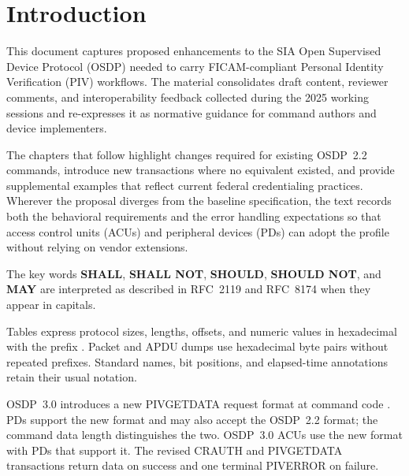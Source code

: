 \section{Introduction}

This document captures proposed enhancements to the SIA Open Supervised Device Protocol (OSDP) needed to carry FICAM-compliant Personal Identity Verification (PIV) workflows. The material consolidates draft content, reviewer comments, and interoperability feedback collected during the 2025 working sessions and re-expresses it as normative guidance for command authors and device implementers.

The chapters that follow highlight changes required for existing OSDP~2.2 commands, introduce new transactions where no equivalent existed, and provide supplemental examples that reflect current federal credentialing practices. Wherever the proposal diverges from the baseline specification, the text records both the behavioral requirements and the error handling expectations so that access control units (ACUs) and peripheral devices (PDs) can adopt the profile without relying on vendor extensions.

The key words \textbf{SHALL}, \textbf{SHALL NOT}, \textbf{SHOULD},
\textbf{SHOULD NOT}, and \textbf{MAY} are interpreted as described in RFC~2119
and RFC~8174 when they appear in capitals.

Tables express protocol sizes, lengths, offsets, and numeric values in
hexadecimal with the prefix . Packet and APDU dumps use hexadecimal
byte pairs without repeated prefixes. Standard names, bit positions, and
elapsed-time annotations retain their usual notation.

OSDP~3.0 introduces a new PIVGETDATA request format at command code
. PDs support the new format and may also accept the OSDP~2.2
format; the command data length distinguishes the two. OSDP~3.0 ACUs use
the new format with PDs that support it. The revised CRAUTH and PIVGETDATA
transactions return data on success and one terminal PIVERROR on failure.
